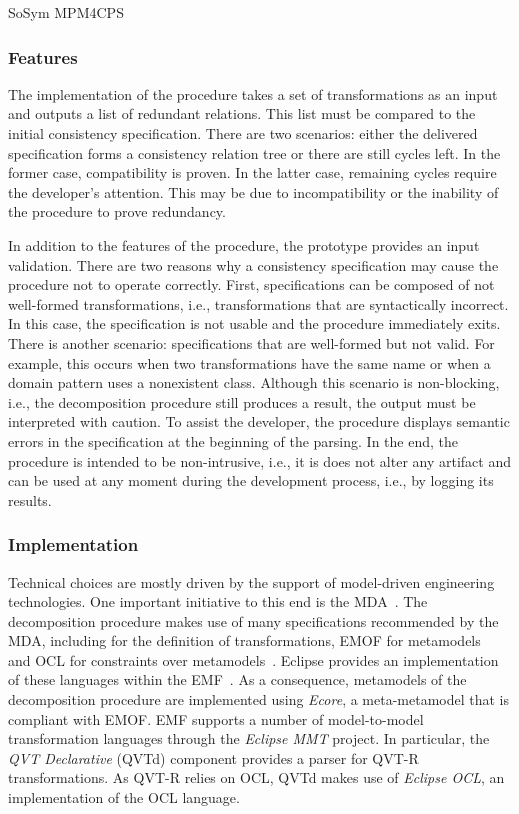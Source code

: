 \begin{copiedFrom}{SoSym MPM4CPS}
\subsubsection{Features}

The implementation of the procedure takes a set of \qvtr transformations as an input and outputs a list of redundant \qvtr relations. This list must be compared to the initial consistency specification. There are two scenarios: either the delivered specification %
forms a consistency relation tree or there are still cycles left. %
In the former case, compatibility is proven. In the latter case, remaining cycles require the developer's attention. This may be due to incompatibility or the inability of the procedure to prove redundancy.

In addition to the features of the procedure, the prototype provides an input validation. There are two reasons why a consistency specification may cause the procedure not to operate correctly. First, specifications can be composed of not well-formed transformations, i.e., \qvtr transformations that are syntactically incorrect. In this case, the specification is not usable and the procedure immediately exits. There is another scenario: specifications that are well-formed but not valid. For example, this occurs when two transformations have the same name or when a \qvtr domain pattern uses a nonexistent class. Although this scenario is non-blocking, i.e., the decomposition procedure still produces a result, the output must be interpreted with caution. To assist the developer, the procedure displays semantic errors in the specification at the beginning of the parsing. In the end, the procedure is intended to be non-intrusive, i.e., it is does not alter any artifact and can be used at any moment during the development process, i.e., by logging its results.

\subsubsection{Implementation}

Technical choices are mostly driven by the support of model-driven engineering technologies. One important initiative to this end is the \ac{MDA}~\cite{mda}. %
The decomposition procedure makes use of many specifications recommended by the MDA, including \qvtr for the definition of transformations, \ac{EMOF} for metamodels~\cite{mof} and OCL for constraints over metamodels~\cite{ocl}. Eclipse provides an implementation of these languages within the \ac{EMF}~\cite{steinberg2009emf}. As a consequence, metamodels of the decomposition procedure are implemented using \textit{Ecore}, a meta-metamodel that is compliant with \ac{EMOF}. EMF supports a number of model-to-model transformation languages through the \textit{Eclipse MMT} project. In particular, the \textit{QVT Declarative} (QVTd) component provides a parser for QVT-R transformations. As QVT-R relies on OCL, QVTd makes use of \textit{Eclipse OCL}, an implementation of the OCL language.


\end{copiedFrom}
